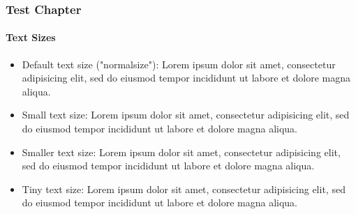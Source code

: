 
\begin{frame}
	\frametitle{Test Chapter}
	\framesubtitle{Text Sizes}

	\begin{itemize}
		\item Default text size ("normalsize"):\newline
			Lorem ipsum dolor sit amet, consectetur adipisicing elit, sed do eiusmod tempor incididunt ut labore et dolore magna aliqua.

		\item Small text size:\newline
			\small
				Lorem ipsum dolor sit amet, consectetur adipisicing elit, sed do eiusmod tempor incididunt ut labore et dolore magna aliqua.
			\normalsize

		\item Smaller text size:\newline
			\smaller
				Lorem ipsum dolor sit amet, consectetur adipisicing elit, sed do eiusmod tempor incididunt ut labore et dolore magna aliqua.
			\normalsize

		\item Tiny text size:\newline
			\tiny
				Lorem ipsum dolor sit amet, consectetur adipisicing elit, sed do eiusmod tempor incididunt ut labore et dolore magna aliqua.
			\normalsize

	\end{itemize}
\end{frame}


